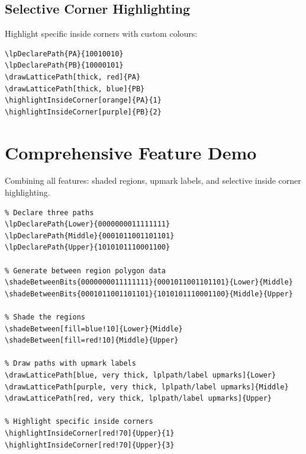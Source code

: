 \documentclass{article}
\begin{document}
\subsection{Selective Corner Highlighting}

Highlight specific inside corners with custom colours:

\begin{verbatim}
\lpDeclarePath{PA}{10010010}
\lpDeclarePath{PB}{10000101}
\drawLatticePath[thick, red]{PA}
\drawLatticePath[thick, blue]{PB}
\highlightInsideCorner[orange]{PA}{1}
\highlightInsideCorner[purple]{PB}{2}
\end{verbatim}

\begin{center}
\end{center}

\section{Comprehensive Feature Demo}

Combining all features: shaded regions, upmark labels, and selective inside corner highlighting.

\begin{verbatim}
% Declare three paths
\lpDeclarePath{Lower}{0000000011111111}
\lpDeclarePath{Middle}{0001011001101101}
\lpDeclarePath{Upper}{1010101110001100}

% Generate between region polygon data
\shadeBetweenBits{0000000011111111}{0001011001101101}{Lower}{Middle}
\shadeBetweenBits{0001011001101101}{1010101110001100}{Middle}{Upper}

% Shade the regions
\shadeBetween[fill=blue!10]{Lower}{Middle}
\shadeBetween[fill=red!10]{Middle}{Upper}

% Draw paths with upmark labels
\drawLatticePath[blue, very thick, lplpath/label upmarks]{Lower}
\drawLatticePath[purple, very thick, lplpath/label upmarks]{Middle}
\drawLatticePath[red, very thick, lplpath/label upmarks]{Upper}

% Highlight specific inside corners
\highlightInsideCorner[red!70]{Upper}{1}
\highlightInsideCorner[red!70]{Upper}{3}
\end{verbatim}
\end{document}
